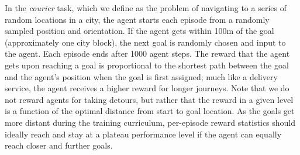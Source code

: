 In the \emph{courier} task, which we define as the problem of navigating to a series of random locations in a city, the agent starts each episode from a randomly sampled position and orientation. If the agent gets within 100m of the goal (approximately one city block), the next goal is randomly chosen and input to the agent. 
Each episode ends after 1000 agent steps.  The reward that the agent gets upon reaching a goal is proportional to the shortest path between the goal and the agent's position when the goal is first assigned; much like a delivery service, the agent receives a higher reward for longer journeys. Note that we do not reward agents for taking detours, but rather that the reward in a given level is a function of the optimal distance from start to goal location. As the goals get more distant during the training curriculum, per-episode reward statistics should ideally reach and stay at a plateau performance level if the agent can equally reach closer and further goals.
